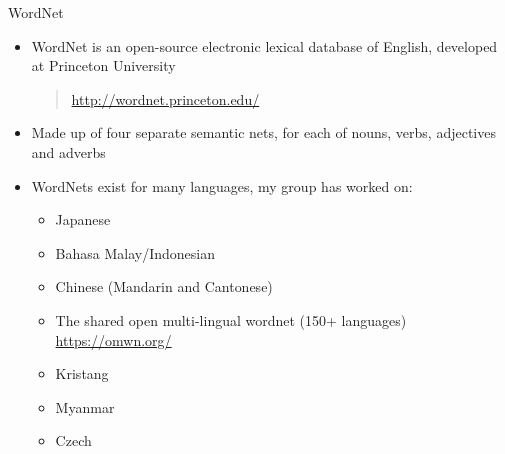 \documentclass{beamer}
\begin{document}
\begin{frame}{WordNet}


\begin{itemize}
\item WordNet is an open-source electronic lexical database of English,
  developed at Princeton University
  \begin{quote}
    \url{http://wordnet.princeton.edu/}
  \end{quote}
\item Made up of four separate semantic nets, for each of nouns, verbs,
  adjectives and adverbs
\item WordNets exist for many languages, my group has worked on:
  \begin{itemize}
  \item Japanese 
  \item Bahasa Malay/Indonesian
  \item Chinese (Mandarin and Cantonese)
  \item The shared open multi-lingual wordnet (150+ languages) 
    \\ \url{https://omwn.org/}
  \item Kristang
  \item Myanmar
  \item Czech
\end{itemize}
\end{itemize}
\end{frame}
\end{document}

